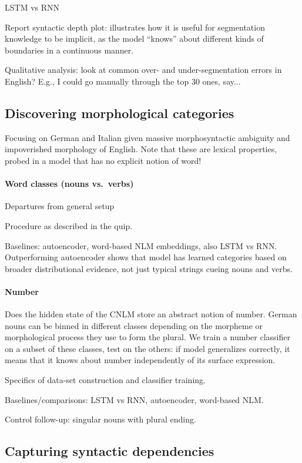 LSTM vs RNN

Report syntactic depth plot: illustrates how it is useful for
segmentation knowledge to be implicit, as the model ``knows'' about
different kinds of boundaries in a continuous manner.

Qualitative analysis: look at common over- and under-segmentation
errors in English? E.g., I could go manually through the top 30 ones,
say...

\subsection{Discovering morphological categories}
\label{sec:categories}

Focusing on German and Italian given massive morphosyntactic ambiguity
and impoverished morphology of English. Note that these are lexical
properties, probed in a model that has no explicit notion of word!

\paragraph{Word classes (nouns vs.~verbs)}

Departures from general setup

Procedure as described in the quip.

Baselines: autoencoder, word-based NLM embeddings, also LSTM vs
RNN. Outperforming autoencoder shows that model has learned categories
based on broader distributional evidence, not just typical strings
cueing nouns and verbs.

\paragraph{Number}

Does the hidden state of the CNLM store an abstract notion of
number. German nouns can be binned in different classes depending on
the morpheme or morphological process they use to form the plural. We
train a number classifier on a subset of these classes, test on the
others: if model generalizes correctly, it means that it knows about
number independently of its surface expression.

Specifics of data-set construction and classifier training.

Baselines/comparisons: LSTM vs RNN, autoencoder, word-based NLM.

Control follow-up: singular nouns with plural ending.

\subsection{Capturing syntactic dependencies}
\label{sec:dependencies}

